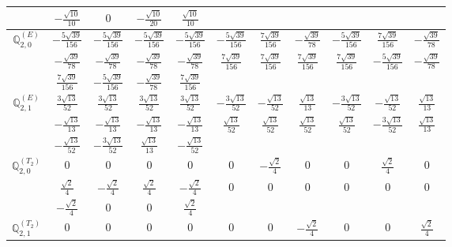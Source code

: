 \documentclass[fleqn,10pt,landscape]{article}
\begin{document}
\begin{itemize}
{\begin{center}
\begin{longtable}{ccccccccccc}
& $ - \frac{\sqrt{10}}{10} $ & $ 0 $ & $ - \frac{\sqrt{10}}{20} $ & $ \frac{\sqrt{10}}{10} $ & $  $ & $  $ & $  $ & $  $ & $  $ & $  $ \\ \hline
$\mathbb{Q}_{2,0}^{(E)}$ & $ - \frac{5 \sqrt{39}}{156} $ & $ - \frac{5 \sqrt{39}}{156} $ & $ - \frac{5 \sqrt{39}}{156} $ & $ - \frac{5 \sqrt{39}}{156} $ & $ - \frac{5 \sqrt{39}}{156} $ & $ \frac{7 \sqrt{39}}{156} $ & $ - \frac{\sqrt{39}}{78} $ & $ - \frac{5 \sqrt{39}}{156} $ & $ \frac{7 \sqrt{39}}{156} $ & $ - \frac{\sqrt{39}}{78} $ \\
& $ - \frac{\sqrt{39}}{78} $ & $ - \frac{\sqrt{39}}{78} $ & $ - \frac{\sqrt{39}}{78} $ & $ - \frac{\sqrt{39}}{78} $ & $ \frac{7 \sqrt{39}}{156} $ & $ \frac{7 \sqrt{39}}{156} $ & $ \frac{7 \sqrt{39}}{156} $ & $ \frac{7 \sqrt{39}}{156} $ & $ - \frac{5 \sqrt{39}}{156} $ & $ - \frac{\sqrt{39}}{78} $ \\
& $ \frac{7 \sqrt{39}}{156} $ & $ - \frac{5 \sqrt{39}}{156} $ & $ - \frac{\sqrt{39}}{78} $ & $ \frac{7 \sqrt{39}}{156} $ & $  $ & $  $ & $  $ & $  $ & $  $ & $  $ \\ \hline
$\mathbb{Q}_{2,1}^{(E)}$ & $ \frac{3 \sqrt{13}}{52} $ & $ \frac{3 \sqrt{13}}{52} $ & $ \frac{3 \sqrt{13}}{52} $ & $ \frac{3 \sqrt{13}}{52} $ & $ - \frac{3 \sqrt{13}}{52} $ & $ - \frac{\sqrt{13}}{52} $ & $ \frac{\sqrt{13}}{13} $ & $ - \frac{3 \sqrt{13}}{52} $ & $ - \frac{\sqrt{13}}{52} $ & $ \frac{\sqrt{13}}{13} $ \\
& $ - \frac{\sqrt{13}}{13} $ & $ - \frac{\sqrt{13}}{13} $ & $ - \frac{\sqrt{13}}{13} $ & $ - \frac{\sqrt{13}}{13} $ & $ \frac{\sqrt{13}}{52} $ & $ \frac{\sqrt{13}}{52} $ & $ \frac{\sqrt{13}}{52} $ & $ \frac{\sqrt{13}}{52} $ & $ - \frac{3 \sqrt{13}}{52} $ & $ \frac{\sqrt{13}}{13} $ \\
& $ - \frac{\sqrt{13}}{52} $ & $ - \frac{3 \sqrt{13}}{52} $ & $ \frac{\sqrt{13}}{13} $ & $ - \frac{\sqrt{13}}{52} $ & $  $ & $  $ & $  $ & $  $ & $  $ & $  $ \\ \hline
$\mathbb{Q}_{2,0}^{(T_{2})}$ & $ 0 $ & $ 0 $ & $ 0 $ & $ 0 $ & $ 0 $ & $ - \frac{\sqrt{2}}{4} $ & $ 0 $ & $ 0 $ & $ \frac{\sqrt{2}}{4} $ & $ 0 $ \\
& $ \frac{\sqrt{2}}{4} $ & $ - \frac{\sqrt{2}}{4} $ & $ \frac{\sqrt{2}}{4} $ & $ - \frac{\sqrt{2}}{4} $ & $ 0 $ & $ 0 $ & $ 0 $ & $ 0 $ & $ 0 $ & $ 0 $ \\
& $ - \frac{\sqrt{2}}{4} $ & $ 0 $ & $ 0 $ & $ \frac{\sqrt{2}}{4} $ & $  $ & $  $ & $  $ & $  $ & $  $ & $  $ \\ \hline
$\mathbb{Q}_{2,1}^{(T_{2})}$ & $ 0 $ & $ 0 $ & $ 0 $ & $ 0 $ & $ 0 $ & $ 0 $ & $ - \frac{\sqrt{2}}{4} $ & $ 0 $ & $ 0 $ & $ \frac{\sqrt{2}}{4} $ \\

\end{longtable}
\end{center}}
\end{itemize}
\end{document}
